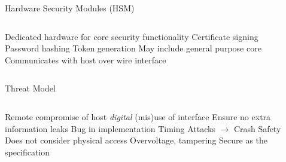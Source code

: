 \begin{frame}{Hardware Security Modules (HSM)}
\begin{columns}
  \centering
  \begin{outline}
  \1 Dedicated hardware for core security functionality
  \2 Certificate signing
  \2 Password hashing
  \2 Token generation
  \1 May include general purpose core
  \1 Communicates with host over wire interface
  \end{outline}

  \centering
  \begin{center}


  \end{center}
\end{columns}
\end{frame}

\begin{frame}{Threat Model}
\begin{columns}
  \centering
  \begin{outline}
  \1 Remote compromise of host 
  \1 \textit{digital} (mis)use of interface
  \1 Ensure no extra information leaks
  \2 Bug in implementation
  \2 Timing Attacks $\rightarrow$ 
  \2 Crash Safety
  \1 Does not consider physical access
  \2 Overvoltage, tampering
  \2 Secure as the specification
  \end{outline}

  \centering
  \begin{center}

  \end{center}
\end{columns}
\end{frame}
